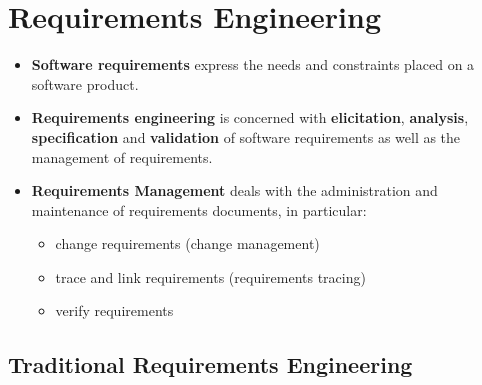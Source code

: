 \documentclass[ieeetran]{article}
\begin{document}
\section{Requirements Engineering} %
\label{sec:requirements_engineering}

\begin{itemize}

\item \textbf{Software requirements} express the needs and constraints placed on a software product.

  \item \textbf{Requirements engineering} is concerned with \textbf{elicitation}, \textbf{analysis}, \textbf{specification} and \textbf{validation} of software requirements as well as the management of requirements.

\item \textbf{Requirements Management} deals with the administration and maintenance of requirements documents, in particular:
	\begin{itemize}
	  \item change requirements (change management)
          \item trace and link requirements (requirements tracing)
	  \item verify requirements
	\end{itemize}


\end{itemize}

\subsection{Traditional Requirements Engineering} %
\label{sub:traditional_requirements_engineering}
\end{document}
